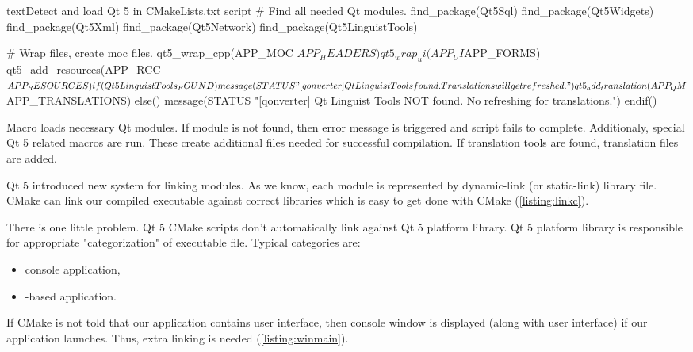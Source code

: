 \begin{fdoccode}{text}{}{Detect and load Qt 5 in CMakeLists.txt script}
# Find all needed Qt modules.
find_package(Qt5Sql)
find_package(Qt5Widgets)
find_package(Qt5Xml)
find_package(Qt5Network)
find_package(Qt5LinguistTools)

# Wrap files, create moc files.
qt5_wrap_cpp(APP_MOC ${APP_HEADERS})
qt5_wrap_ui(APP_UI ${APP_FORMS})
qt5_add_resources(APP_RCC ${APP_RESOURCES})

if(Qt5LinguistTools_FOUND)
    message(STATUS "[qonverter] Qt Linguist Tools found. Translations will get refreshed.")
    qt5_add_translation(APP_QM ${APP_TRANSLATIONS})
else()
    message(STATUS "[qonverter] Qt Linguist Tools NOT found. No refreshing for translations.")
endif()
\end{fdoccode}

Macro loads necessary Qt modules. If module is not found, then error message is triggered and script fails to complete. Additionaly, special Qt 5 related macros are run. These create additional files needed for successful compilation. If translation tools are found, translation files are added.

Qt 5 introduced new system for linking modules. As we know, each module is represented by dynamic-link (or static-link) library file. CMake can link our compiled executable against correct libraries which is easy to get done with CMake (\autoref{listing:linkc}).


There is one little problem. Qt 5 CMake scripts don't automatically link against Qt 5 platform library. Qt 5 platform library is responsible for appropriate "categorization" of executable file. Typical categories are:
\begin{itemize}
\item console application,
\item {}-based application.
\end{itemize}

If CMake is not told that our application contains user interface, then console window is displayed (along with user interface) if our application launches. Thus, extra linking is needed (\autoref{listing:winmain}).

